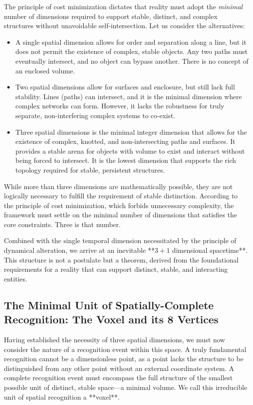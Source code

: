 \documentclass[11pt,a4paper]{article}
\begin{document}
The principle of cost minimization dictates that reality must adopt the \emph{minimal} number of dimensions required to support stable, distinct, and complex structures without unavoidable self-intersection. Let us consider the alternatives:
\begin{itemize}
    \item A single spatial dimension allows for order and separation along a line, but it does not permit the existence of complex, stable objects. Any two paths must eventually intersect, and no object can bypass another. There is no concept of an enclosed volume.
    \item Two spatial dimensions allow for surfaces and enclosure, but still lack full stability. Lines (paths) can intersect, and it is the minimal dimension where complex networks can form. However, it lacks the robustness for truly separate, non-interfering complex systems to co-exist.
    \item Three spatial dimensions is the minimal integer dimension that allows for the existence of complex, knotted, and non-intersecting paths and surfaces. It provides a stable arena for objects with volume to exist and interact without being forced to intersect. It is the lowest dimension that supports the rich topology required for stable, persistent structures.
\end{itemize}
While more than three dimensions are mathematically possible, they are not logically necessary to fulfill the requirement of stable distinction. According to the principle of cost minimization, which forbids unnecessary complexity, the framework must settle on the minimal number of dimensions that satisfies the core constraints. Three is that number.

Combined with the single temporal dimension necessitated by the principle of dynamical alteration, we arrive at an inevitable **\(3+1\) dimensional spacetime**. This structure is not a postulate but a theorem, derived from the foundational requirements for a reality that can support distinct, stable, and interacting entities.

\subsection{The Minimal Unit of Spatially-Complete Recognition: The Voxel and its 8 Vertices}
Having established the necessity of three spatial dimensions, we must now consider the nature of a recognition event within this space. A truly fundamental recognition cannot be a dimensionless point, as a point lacks the structure to be distinguished from any other point without an external coordinate system. A complete recognition event must encompass the full structure of the smallest possible unit of distinct, stable space—a minimal volume. We call this irreducible unit of spatial recognition a **voxel**.
\end{document}
